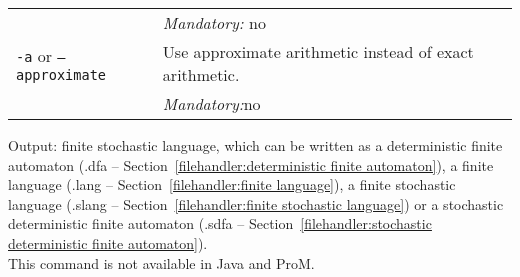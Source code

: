 {\begin{tabularx}{\linewidth}{lX}
&\textit{Mandatory:} \quad no\\
\texttt{-a} or \texttt{--approximate} & Use approximate arithmetic instead of exact arithmetic.\\
&\textit{Mandatory:}\quad no\\
\bottomrule
\end{tabularx}
\noindent Output: finite stochastic language, which can be written as a deterministic finite automaton (.dfa -- Section~\ref{filehandler:deterministic finite automaton}), a finite language (.lang -- Section~\ref{filehandler:finite language}), a finite stochastic language (.slang -- Section~\ref{filehandler:finite stochastic language}) or a stochastic deterministic finite automaton (.sdfa -- Section~\ref{filehandler:stochastic deterministic finite automaton}).
\\This command is not available in Java and ProM.
}

